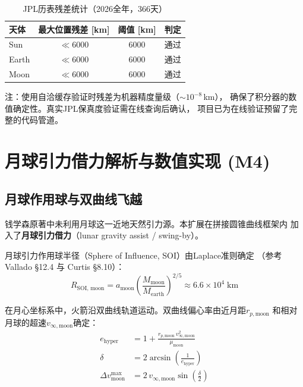 \documentclass[UTF8,12pt,a4paper]{ctexart}
\begin{document}
\begin{table}[htbp]
\centering
\caption{JPL历表残差统计（2026全年，366天）}
\label{tab:jpl_residuals}
\begin{tabular}{lccc}
\toprule
天体 & 最大位置残差 [km] & 阈值 [km] & 判定 \\
\midrule
Sun   & $\ll 6000$ & 6000 & 通过 \\
Earth & $\ll 6000$ & 6000 & 通过 \\
Moon  & $\ll 6000$ & 6000 & 通过 \\
\bottomrule
\end{tabular}
\end{table}

注：使用自洽缓存验证时残差为机器精度量级（$\sim 10^{-8}$\,km），
确保了积分器的数值确定性。真实JPL保真度验证需在线查询后确认，
项目已为在线验证预留了完整的代码管道。

\section{月球引力借力解析与数值实现 (M4)}

\subsection{月球作用球与双曲线飞越}

钱学森原著中未利用月球这一近地天然引力源。本扩展在拼接圆锥曲线框架内
加入了\textbf{月球引力借力}（lunar gravity assist / swing-by）。

月球引力作用球半径（Sphere of Influence, SOI）由Laplace准则确定
（参考 Vallado \cite{vallado2013} §12.4 与 Curtis \cite{curtis2014} §8.10）：
\begin{equation}
    R_{\text{SOI, moon}} = a_{\text{moon}}
    \left(\frac{M_{\text{moon}}}{M_{\text{earth}}}\right)^{2/5}
    \approx 6.6\times 10^4\;\text{km}
\end{equation}

在月心坐标系中，火箭沿双曲线轨道运动。双曲线偏心率由近月距$r_{p,\text{moon}}$
和相对月球的超速$v_{\infty,\text{moon}}$确定：
\begin{align}
    e_{\text{hyper}} &= 1 + \frac{r_{p,\text{moon}}\,v_{\infty,\text{moon}}^2}
                           {\mu_{\text{moon}}} \label{eq:e_hyper} \\
    \delta &= 2\arcsin\left(\frac{1}{e_{\text{hyper}}}\right) \label{eq:bend} \\
    \Delta v_{\text{moon}}^{\max} &= 2\,v_{\infty,\text{moon}}
                                    \sin\left(\frac{\delta}{2}\right) \label{eq:dv_moon}
\end{align}
\end{document}

